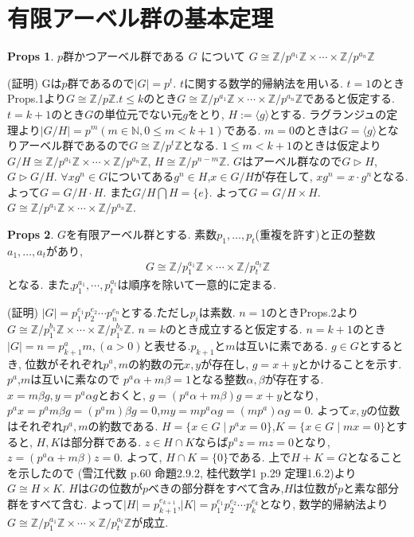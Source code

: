 \documentclass[dvipdfmx]{jsarticle}
\theoremstyle{definition}
\newtheorem{props}{Props}
\numberwithin{equation}{section}
\numberwithin{props}{section}
\numberwithin{definition}{section}
\numberwithin{note}{section}
\newcommand{\ZZ}{\mathbb{Z}}
\newcommand{\NN}{\mathbb{N}}
\begin{document}
\section{有限アーベル群の基本定理}
\begin{props}
     $p$群かつアーベル群である $G$ について $G\cong\ZZ/p^{a_1}\ZZ\times\cdots\times\ZZ/p^{a_n}\ZZ$
\end{props}
(証明) Gは$p$群であるので$\lvert G\rvert = p^t$. $t$に関する数学的帰納法を用いる.  $t=1$のときProps.1より$G\cong\ZZ/p\ZZ$.$t\leq k$のとき$G\cong\ZZ/p^{a_1}\ZZ\times\cdots\times\ZZ/p^{a_n}\ZZ$であると仮定する.
$t=k+1$のとき$G$の単位元でない元$g$をとり, $H:=\langle g\rangle$とする. ラグランジュの定理より$\lvert G/H\rvert = p^m(m\in \NN,0\leq m<k+1)$である. $m=0$のときは$G=\langle g \rangle$となりアーベル群であるので$G\cong \ZZ/p^t\ZZ$となる. $1\leq m<k+1$のときは仮定より$G/H \cong \ZZ/p^{a_1}\ZZ\times\cdots\times\ZZ/p^{a_n}\ZZ$, $H\cong\ZZ/p^{n-m}\ZZ$.
$G$はアーベル群なので$G\rhd H$,$G\rhd G/H$. $\forall xg^n \in G$についてある$g^n \in H$,$x\in G/H$が存在して, $xg^n = x\cdot g^n$となる. よって$G= G/H\cdot H$.
また$G/H\bigcap H = \lbrace e\rbrace$. よって$G=G/H\times H$. $G\cong\ZZ/p^{a_1}\ZZ\times\cdots\times\ZZ/p^{a_n}\ZZ$.
\begin{props}
     $G$を有限アーベル群とする. 素数$p_1,\ldots,p_t$(重複を許す)と正の整数$a_1,\ldots,a_t$があり,
     \begin{align}
          G\cong \ZZ/p_1^{a_1}\ZZ\times\cdots\times\ZZ/p_t^{a_t}\ZZ
     \end{align}
     となる. また,$p_1^{a_1},\cdots,p_t^{a_t}$は順序を除いて一意的に定まる.
\end{props}
(証明)
$\lvert G\rvert =p_1^{e_1}p_2^{e_2}\cdots p_n^{e_n}$とする.ただし$p_i$は素数. $n=1$のときProps.2より$G\cong \ZZ/p_1^{b_1}\ZZ\times\cdots\times\ZZ/p_1^{b_n}\ZZ$. $n=k$のとき成立すると仮定する. $n=k+1$のとき$\lvert G\rvert=n=p_{k+1}^am,(a>0)$と表せる.$p_{k+1}$と$m$は互いに素である. $g\in G$とするとき, 位数がそれぞれ$p^a,m$の約数の元$x,y$が存在し, $g=x+y$とかけることを示す. $p^a$,$m$は互いに素なので $p^a\alpha+m\beta=1$となる整数$\alpha,\beta$が存在する. $x=m\beta g,y=p^a\alpha g$とおくと, $g=(p^a\alpha+m\beta)g=x+y$となり, $p^ax=p^am\beta g= (p^am)\beta g=0$,$my= mp^a\alpha g=(mp^a)\alpha g=0$. よって$x,y$の位数はそれぞれ$p^a,m$の約数である.
$H=\lbrace x\in G\mid p^ax=0\rbrace$,$K=\lbrace x\in G\mid mx=0\rbrace$とすると, $H,K$は部分群である. $z\in H\cap K$ならば$p^a z=mz=0$となり, $z=(p^a\alpha+m\beta)z=0$. よって, $H\cap K=\lbrace 0\rbrace$である. 上で$H+K=G$となることを示したので (雪江代数 p.60 命題2.9.2, 桂代数学1 p.29 定理1.6.2)より$G\cong H\times K$. $H$は$G$の位数が$p$べきの部分群をすべて含み,$H$は位数が$p$と素な部分群をすべて含む. よって$\lvert H\rvert=p_{k+1}^{e_{k+1}}$,$\lvert K\rvert=p_1^{e_1}p_2^{e_2}\cdots p_k^{e_k}$となり, 数学的帰納法より$G\cong \ZZ/p_1^{a_1}\ZZ\times\cdots\times\ZZ/p_t^{a_t}\ZZ$が成立.
\end{document}
